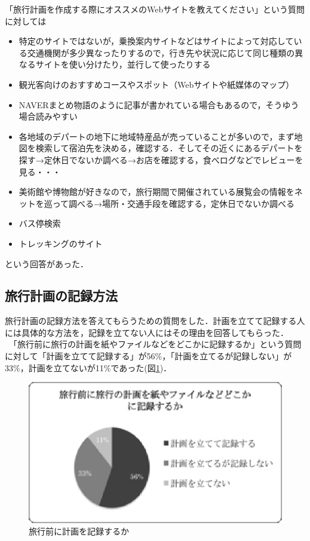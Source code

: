 \documentclass{funthesis}
\begin{document}
「旅行計画を作成する際にオススメのWebサイトを教えてください」という質問に対しては
\begin{itemize}
 \item 特定のサイトではないが，乗換案内サイトなどはサイトによって対応している交通機関が多少異なったりするので，行き先や状況に応じて同じ種類の異なるサイトを使い分けたり，並行して使ったりする
 \item 観光客向けのおすすめコースやスポット（Webサイトや紙媒体のマップ）
 \item NAVERまとめ物語のように記事が書かれている場合もあるので，そうゆう場合読みやすい
 \item 各地域のデパートの地下に地域特産品が売っていることが多いので，まず地図を検索して宿泊先を決める，確認する．そしてその近くにあるデパートを探す→定休日でないか調べる→お店を確認する，食べログなどでレビューを見る・・・
 \item 美術館や博物館が好きなので，旅行期間で開催されている展覧会の情報をネットを巡って調べる→場所・交通手段を確認する，定休日でないか調べる
 \item バス停検索
 \item トレッキングのサイト
\end{itemize}
という回答があった．


\subsection{旅行計画の記録方法}

旅行計画の記録方法を答えてもらうための質問をした．計画を立てて記録する人には具体的な方法を，記録を立てない人にはその理由を回答してもらった．\\
　「旅行前に旅行の計画を紙やファイルなどをどこかに記録するか」という質問に対して「計画を立てて記録する」が56\%，「計画を立てるが記録しない」が33\%，計画を立てないが11\%であった(図\ref{Lfilerecord})．

\begin{figure}[htpb]
\begin{center}
\includegraphics[scale=0.65]{filerecord.eps}
\end{center}
\caption{旅行前に計画を記録するか}
\label{Lfilerecord}
\end{figure}
\end{document}
